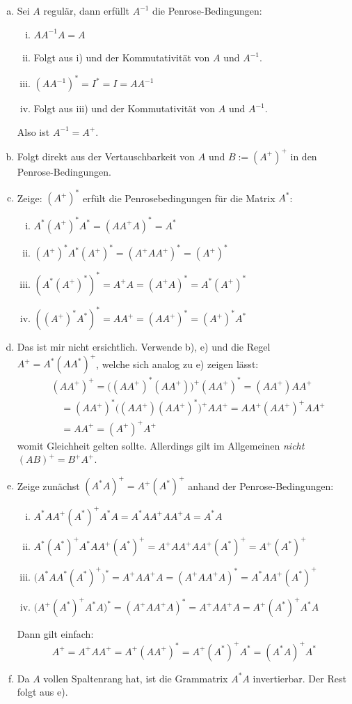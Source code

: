 \documentclass[a4paper]{scrartcl}
\begin{document}
\begin{aufgabe}
	\begin{enumerate}[a)]
		\item
			Sei $A$ regulär, dann erfüllt $A^{-1}$ die Penrose-Bedingungen:
			\begin{enumerate}[i)]
				\item
					$AA^{-1}A = A$
				\item
					Folgt aus i) und der Kommutativität von $A$ und $A^{-1}$.
				\item
					$(AA^{-1})^* = I^* = I = AA^{-1}$
				\item
					Folgt aus iii) und der Kommutativität von $A$ und $A^{-1}$.
			\end{enumerate}
			Also ist $A^{-1} = A^+$.
		\item
			Folgt direkt aus der Vertauschbarkeit von $A$ und $B:=(A^+)^+$ in den Penrose-Bedingungen.
		\item
			Zeige: $(A^+)^*$ erfült die Penrosebedingungen für die Matrix $A^*$:
			\begin{enumerate}[i)]
				\item
					$A^*(A^+)^*A^* = (AA^+A)^* = A^*$
				\item
					$(A^+)^*A^*(A^+)^* = (A^+AA^+)^* = (A^+)^*$
				\item
					$(A^*(A^+)^*)^* = A^+A = (A^+A)^* = A^*(A^+)^*$
				\item
					$((A^+)^*A^*)^* = AA^+ = (AA^+)^* = (A^+)^*A^*$
			\end{enumerate}
		\item
			Das ist mir nicht ersichtlich.
			Verwende b), e) und die Regel $A^+ = A^*(AA^*)^+$, welche sich analog zu e) zeigen lässt:
			\begin{align*}
				&(AA^+)^+ 
				= \Big((AA^+)^*(AA^+)\Big)^+(AA^+)^*
				= (AA^+)AA^+\\
				&\quad= (AA^+)^*\Big((AA^+)(AA^+)^*\Big)^+ AA^+
				= AA^+(AA^+)^+AA^+ \\
				&\quad= AA^+
				= (A^+)^+A^+
			\end{align*}
			womit Gleichheit gelten sollte.
			Allerdings gilt im Allgemeinen \emph{nicht} $(AB)^+ = B^+A^+$.
		\item
			Zeige zunächst $(A^*A)^+ = A^+(A^*)^+$ anhand der Penrose-Bedingungen:
			\begin{enumerate}[i)]
				\item
					$A^*AA^+(A^*)^+A^*A = A^*AA^+AA^+A = A^*A$
				\item
					$A^*(A^*)^+A^*AA^+(A^*)^+ = A^+AA^+AA^+(A^*)^+ = A^+(A^*)^+$
				\item
					$\big(A^*AA^*(A^*)^+\big)^* = A^+AA^+A = (A^+AA^+A)^* = A^*AA^+(A^*)^+$
				\item
					$\big(A^+(A^*)^+A^*A\big)^* = (A^+AA^+A)^* = A^+AA^+A = A^+(A^*)^+A^*A$
			\end{enumerate}
			Dann gilt einfach:
			\[
				A^+ = A^+AA^+ = A^+(AA^+)^* = A^+(A^*)^+A^* = (A^*A)^+A^*
			\]
		\item
			Da $A$ vollen Spaltenrang hat, ist die Grammatrix $A^*A$ invertierbar.
			Der Rest folgt aus e).
	\end{enumerate}
\end{aufgabe}
\end{document}
